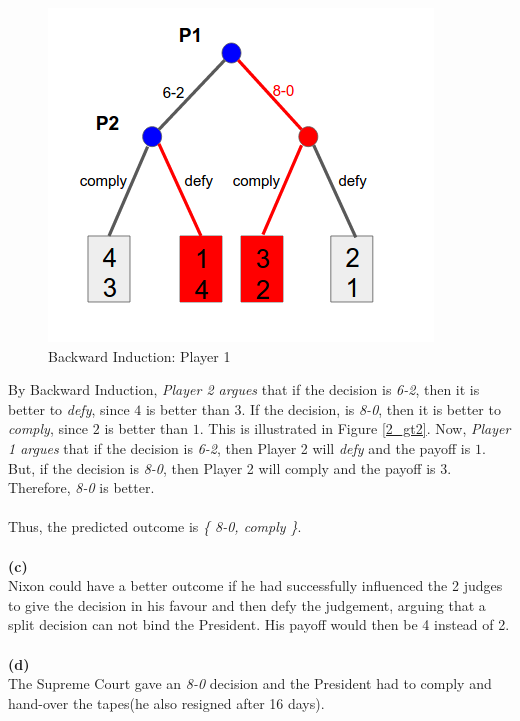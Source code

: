 \documentclass{article}
\begin{document}
\begin{figure}[h!]
\begin{multicols}{3}
\includegraphics[width=1\columnwidth]{2_gt3.png}
\caption{Backward Induction: Player 1}
\label{2_gt3}
\end{multicols}
\end{figure}

By Backward Induction, \emph{Player 2 argues} that if the decision is \emph{6-2}, then it is better to \emph{defy}, since $4$ is better than $3$. If the decision, is \emph{8-0}, then it is better to \emph{comply}, since $2$ is better than $1$. This is illustrated in Figure \ref{2_gt2}. Now, \emph{Player 1 argues} that if the decision is \emph{6-2}, then Player 2 will \emph{defy} and the payoff is $1$. But, if the decision is \emph{8-0}, then Player 2 will comply and the payoff is $3$. Therefore, \emph{8-0} is better. \\ \\
Thus, the predicted outcome is \emph{\{ 8-0, comply \}}. \\ \\
\textbf{(c)} \\
Nixon could have a better outcome if he had successfully influenced the 2 judges to give the decision in his favour and then defy the judgement, arguing that a split decision can not bind the President. His payoff would then be 4 instead of 2.\\ \\
\textbf{(d)} \\
The Supreme Court gave an \emph{8-0} decision and the President had to comply and hand-over the tapes(he also resigned after 16 days).
\end{document}
